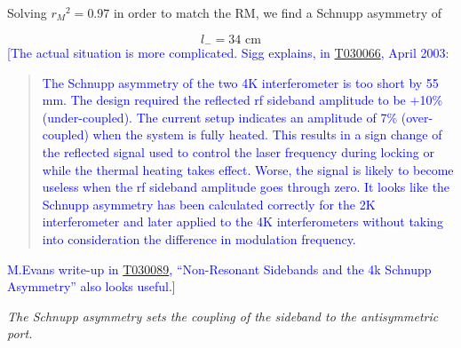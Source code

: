 Solving $r_{M}{}^{2}=0.97$ in order to match the RM, we find a Schnupp
asymmetry of

\[
l_{-}=34\text{\ cm}
\]
\textcolor{blue}{{[}The actual situation is more complicated. Sigg
explains, in \href{http://www.ligo.caltech.edu/docs/T/T030066-00.pdf}{T030066},
April 2003:}
\begin{quote}
\textcolor{blue}{The Schnupp asymmetry of the two 4K interferometer
is too short by 55 mm. The design required the reflected rf sideband
amplitude to be +10\% (under-coupled). The current setup indicates
an amplitude of \textendash{}7\% (over-coupled) when the system is
fully heated. This results in a sign change of the reflected signal
used to control the laser frequency during locking or while the thermal
heating takes effect. Worse, the signal is likely to become useless
when the rf sideband amplitude goes through zero. It looks like the
Schnupp asymmetry has been calculated correctly for the 2K interferometer
and later applied to the 4K interferometers without taking into consideration
the difference in modulation frequency. }
\end{quote}
\textcolor{blue}{M.Evans write-up in \href{http://www.ligo.caltech.edu/docs/T/T030089-00.pdf}{T030089},
{}``Non-Resonant Sidebands and the 4k Schnupp Asymmetry'' also looks
useful.{]}}

\emph{The Schnupp asymmetry sets the coupling of the sideband to the
antisymmetric port.}


